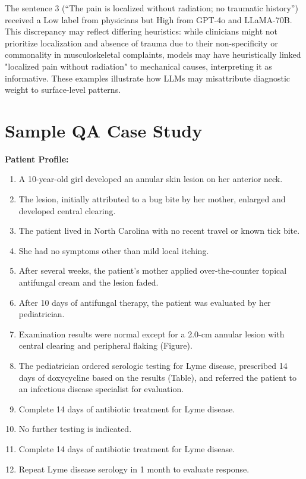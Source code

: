 \documentclass[11pt]{article}
\begin{document}
The sentence 3 (“The pain is localized without radiation; no traumatic history”) received a Low label from physicians but High from GPT-4o and LLaMA-70B. This discrepancy may reflect differing heuristics: while clinicians might not prioritize localization and absence of trauma due to their non-specificity or commonality in musculoskeletal complaints, models may have heuristically linked "localized pain without radiation" to mechanical causes, interpreting it as informative. These examples illustrate how LLMs may misattribute diagnostic weight to surface-level patterns.


\clearpage
\clearpage
\section{Sample QA Case Study}
\label{sample}
\begin{tcolorbox}[colback=blue!3!white, colframe=blue!50!white,
                  title=Example of QA Data (from JAMA QA ID1049), left=10mm, breakable]
\small

\textbf{Patient Profile:}
\begin{enumerate}
    \item A 10-year-old girl developed an annular skin lesion on her anterior neck.
    \item The lesion, initially attributed to a bug bite by her mother, enlarged and developed central clearing.
    \item The patient lived in North Carolina with no recent travel or known tick bite.
    \item She had no symptoms other than mild local itching.
    \item After several weeks, the patient's mother applied over-the-counter topical antifungal cream and the lesion faded.
    \item After 10 days of antifungal therapy, the patient was evaluated by her pediatrician.
    \item Examination results were normal except for a 2.0-cm annular lesion with central clearing and peripheral flaking (Figure).
    \item The pediatrician ordered serologic testing for Lyme disease, prescribed 14 days of doxycycline based on the results (Table), and referred the patient to an infectious disease specialist for evaluation.
    \item Complete 14 days of antibiotic treatment for Lyme disease.
    \item No further testing is indicated.
    \item Complete 14 days of antibiotic treatment for Lyme disease.
    \item Repeat Lyme disease serology in 1 month to evaluate response.
\end{enumerate}


\end{tcolorbox}
\end{document}
